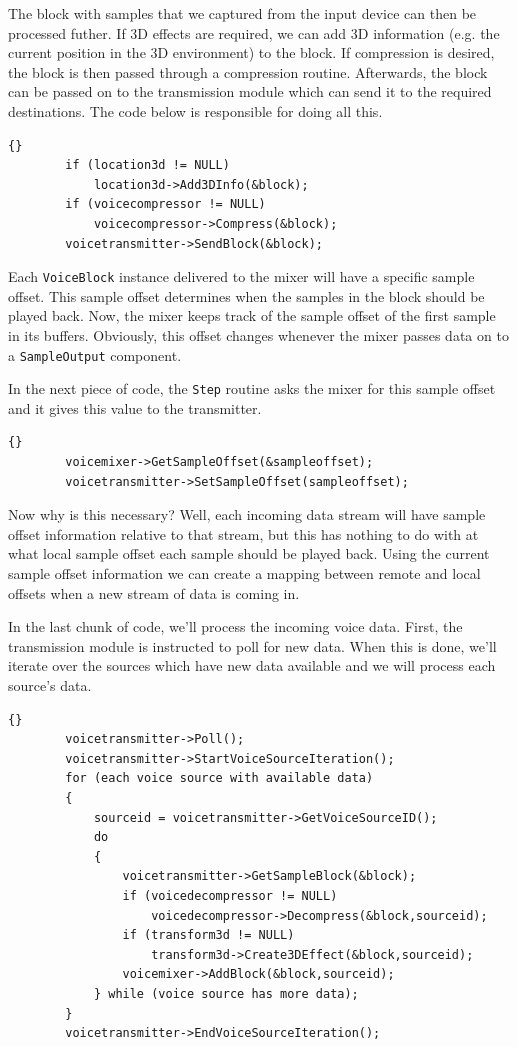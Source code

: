 		The block with samples that we captured from the input device can then
		be processed futher. If 3D effects are required, we can add 3D information
		(e.g. the current position in the 3D environment) to the block. If
		compression is desired, the block is then passed through a compression
		routine. Afterwards, the block can be passed on to the transmission module
		which can send it to the required destinations. The code below is responsible
		for doing all this.
		\begin{lstlisting}[frame=tb]{}
		if (location3d != NULL)
			location3d->Add3DInfo(&block);
		if (voicecompressor != NULL)
			voicecompressor->Compress(&block);
		voicetransmitter->SendBlock(&block);
		\end{lstlisting}
		
		Each {\tt VoiceBlock} instance delivered to the mixer will have a specific
		sample offset. This sample offset determines when the samples in the block
		should be played back. Now, the mixer keeps track of the sample offset of the
		first sample in its buffers. Obviously, this offset changes whenever the mixer
		passes data on to a {\tt SampleOutput} component.
		
		In the next piece of code, the {\tt Step} routine asks the mixer for this
		sample offset and it gives this value to the transmitter.
		\begin{lstlisting}[frame=tb]{}
		voicemixer->GetSampleOffset(&sampleoffset);
		voicetransmitter->SetSampleOffset(sampleoffset);
		\end{lstlisting}
		
		Now why is this necessary? Well, each incoming data stream will have sample
		offset information relative to that stream, but this has nothing to do with
		at what local sample offset each sample should be played back. Using the
		current sample offset information we can create a mapping between remote
		and local offsets when a new stream of data is coming in.
		
		In the last chunk of code, we'll process the incoming voice data. First,
		the transmission module is instructed to poll for new data. When this
		is done, we'll iterate over the sources which have new data available
		and we will process each source's data.
		\begin{lstlisting}[frame=tb]{}
		voicetransmitter->Poll();
		voicetransmitter->StartVoiceSourceIteration();
		for (each voice source with available data)
		{
			sourceid = voicetransmitter->GetVoiceSourceID();
			do
			{
				voicetransmitter->GetSampleBlock(&block);
				if (voicedecompressor != NULL)
					voicedecompressor->Decompress(&block,sourceid);
				if (transform3d != NULL)
					transform3d->Create3DEffect(&block,sourceid);
				voicemixer->AddBlock(&block,sourceid);
			} while (voice source has more data);
		}
		voicetransmitter->EndVoiceSourceIteration();
		\end{lstlisting}
		
